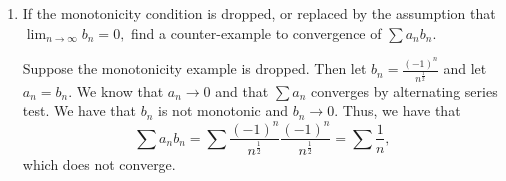 \documentclass[11pt]{article}
\begin{document}
\begin{enumerate}
\begin{solution}
\end{solution}
\item 
\begin{problem}
    If the monotonicity condition is dropped, or replaced by the assumption that $\lim_{n\to \infty} b_n = 0,$ find a counter-example to convergence of $\sum a_nb_n.$
\end{problem}
\begin{solution}
    Suppose the monotonicity example is dropped. Then let $b_n = \frac{(-1)^n}{n^{\frac{1}{2}}}$ and let $a_n = b_n.$ We know that $a_n\to 0$ and that $\sum a_n$ converges by alternating series test. We have that $b_n$ is not monotonic and $b_n \to 0$. Thus, we have that 
    \[\sum a_nb_n = \sum \frac{(-1)^n}{n^{\frac{1}{2}}}\frac{(-1)^n}{n^{\frac{1}{2}}} = \sum \frac{1}{n},\] which does not converge.
\end{solution}
\end{enumerate}

\newpage
\end{document}
